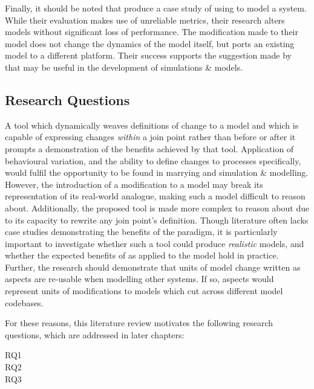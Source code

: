 Finally, it should be noted that \citet{ionescu2009aspect} produce a case study
of using \aop{} to model a system. While their evaluation makes use of
unreliable metrics, their research alters models without significant loss of
performance. The modification made to their model does not change the dynamics
of the model itself, but ports an existing model to a different platform. Their
success supports the suggestion made by \citet{gulyas1999use} that \aop{} may be
useful in the development of simulations \& models. 


\subsection{Research Questions}
\label{subsec:rqs}
\label{rqs}

A tool which dynamically weaves definitions of change to a model and which is
capable of expressing changes \emph{within} a join point rather than before or
after it prompts a demonstration of the benefits achieved by that tool.
Application of behavioural variation, and the ability to define changes to
processes specifically, would fulfil the opportunity to be found in marrying
\aspectorientation{} and simulation \& modelling. However, the introduction of a
modification to a model may break its representation of its real-world analogue,
making such a model difficult to reason about. Additionally, the proposed tool
is made more complex to reason about due to its capacity to rewrite any join
point's definition. Though \aop{} literature often lacks case studies
demonstrating the benefits of the paradigm, it is particularly important to
investigate whether such a tool could produce \emph{realistic} models, and
whether the expected benefits of \aspectorientation{} as applied to the model
hold in practice. Further, the research should demonstrate that units of model
change written as aspects are re-usable when modelling other systems. If so,
aspects would represent units of modifications to models which cut across
different model codebases.

For these reasons, this literature review motivates the following research
questions, which are addressed in later chapters:

\begin{researchquestion}
\begin{description}
  \item[RQ1] \rqtwo{}
  \item[RQ2] \rqthree{}
  \item[RQ3] \rqfour{}
\end{description}
\end{researchquestion}

